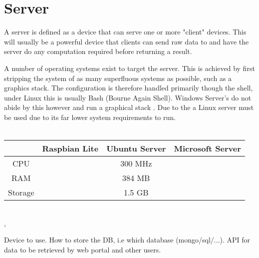 \section{Server}

A server is defined as a device that can serve one or more "client" devices. This will usually be a powerful device that clients can send raw data to and have the server do any computation required before returning a result. \citep{Raymond2003} 

A number of operating systems exist to target the server. This is achieved by first stripping the system of as many superfluous systems as possible, such as a graphics stack. \citep{Guide2016} The configuration is therefore handled primarily though the shell, under Linux this is usually Bash (Bourne Again Shell). Windows Server's do not abide by this however and run a graphical stack \citep{Microsoft2017}. Due to the a Linux server must be used due to its far lower system requirements to run.
\\\\
\begin{center}
\begin{tabular}{cccc}
 			\hline 
 			& \textbf{Raspbian Lite} & \textbf{Ubuntu Server} & \textbf{Microsoft Server} \\ 
 			\hline 
 			CPU &  & 300 MHz &  \\ 
 			RAM &  & 384 MB &  \\ 
 			Storage &  & 1.5 GB &  \\ 
 			\hline 
\end{tabular}
\\\citep{Guide2016},\citep{Microsoft2018}\\
\end{center}
Device to use. How to store the DB, i.e which database (mongo/sql/...). API for data to be retrieved by web portal and other users.